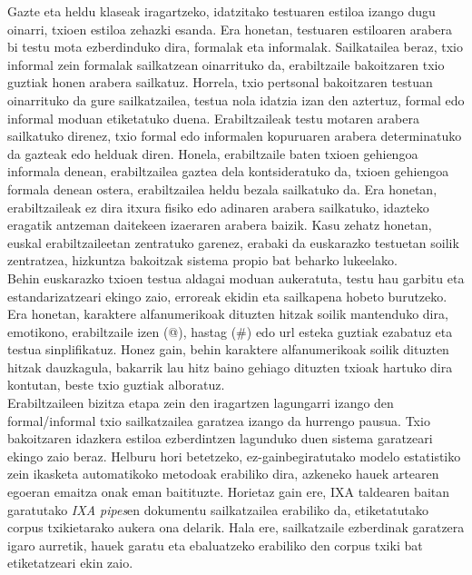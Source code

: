 \documentclass[information,article,submit,moreauthors,pdftex,10pt,a4paper]{Definitions/mdpi}
\begin{document}
\indent Gazte eta heldu klaseak iragartzeko, idatzitako testuaren estiloa izango dugu oinarri, txioen estiloa zehazki esanda. Era honetan, testuaren estiloaren arabera bi testu mota ezberdinduko dira, formalak eta informalak. Sailkatailea beraz, txio informal zein formalak sailkatzean oinarrituko da, erabiltzaile bakoitzaren txio guztiak honen arabera sailkatuz. Horrela, txio pertsonal bakoitzaren testuan oinarrituko da gure sailkatzailea, testua nola idatzia izan den aztertuz, formal edo informal moduan etiketatuko duena. Erabiltzaileak testu motaren arabera sailkatuko direnez, txio formal edo informalen kopuruaren arabera determinatuko da gazteak edo helduak diren. Honela, erabiltzaile baten txioen gehiengoa informala denean, erabiltzailea gaztea dela kontsideratuko da, txioen gehiengoa formala denean ostera, erabiltzailea heldu bezala sailkatuko da. Era honetan, erabiltzaileak ez dira itxura fisiko edo adinaren arabera sailkatuko, idazteko eragatik antzeman daitekeen izaeraren arabera baizik. Kasu zehatz honetan, euskal erabiltzaileetan zentratuko garenez, erabaki da euskarazko testuetan soilik zentratzea, hizkuntza bakoitzak sistema propio bat beharko lukeelako.\\
\indent Behin euskarazko txioen testua aldagai moduan aukeratuta, testu hau garbitu eta estandarizatzeari ekingo zaio, erroreak ekidin eta sailkapena hobeto burutzeko. Era honetan, karaktere alfanumerikoak dituzten hitzak soilik mantenduko dira, emotikono, erabiltzaile izen (@), hastag (\#) edo url esteka guztiak ezabatuz eta testua sinplifikatuz. Honez gain, behin karaktere alfanumerikoak soilik dituzten hitzak dauzkagula, bakarrik lau hitz baino gehiago dituzten txioak hartuko dira kontutan, beste txio guztiak alboratuz.\\
\indent Erabiltzaileen bizitza etapa zein den iragartzen lagungarri izango den formal/informal txio sailkatzailea garatzea izango da hurrengo pausua. Txio bakoitzaren idazkera estiloa ezberdintzen lagunduko duen sistema garatzeari ekingo zaio beraz. Helburu hori betetzeko, ez-gainbegiratutako modelo estatistiko zein ikasketa automatikoko metodoak erabiliko dira, azkeneko hauek artearen egoeran emaitza onak eman baitituzte. Horietaz gain ere, IXA taldearen baitan garatutako \textit{IXA pipes}en dokumentu sailkatzailea erabiliko da, etiketatutako corpus txikietarako aukera ona delarik. Hala ere, sailkatzaile ezberdinak garatzera igaro aurretik, hauek garatu eta ebaluatzeko erabiliko den corpus txiki bat etiketatzeari ekin zaio.

\end{document}
